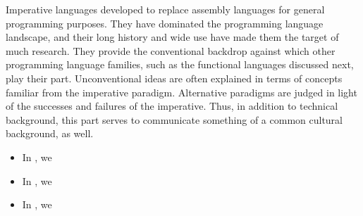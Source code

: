 \label{imperative:conclusion}
Imperative languages developed to replace assembly languages for general programming purposes. They have dominated the programming language landscape, and their long history and wide use have made them the target of much research. They provide the conventional backdrop against which other programming language families, such as the functional languages discussed next, play their part. Unconventional ideas are often explained in terms of concepts familiar from the imperative paradigm. Alternative paradigms are judged in light of the successes and failures of the imperative. Thus, in addition to technical background, this part serves to communicate something of a common cultural background, as well.
\begin{itemize}
\item In , we 

\item In , we 

\item In , we 
\end{itemize}

